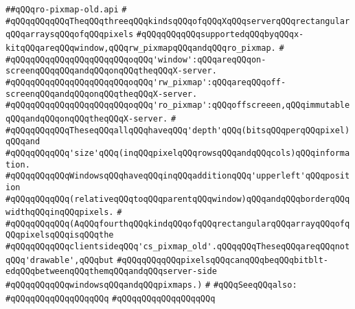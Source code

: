 \label{src/lib/x-kit/xclient/src/window/ro-pixmap-old.api}
\verb|##qQQqro-pixmap-old.api|\newline
\verb|#|\newline
\verb|#qQQqqQQqqQQqTheqQQqthreeqQQqkindsqQQqofqQQqXqQQqserverqQQqrectangularqQQqarraysqQQqofqQQqpixels|\newline
\verb|#qQQqqQQqqQQqsupportedqQQqbyqQQqx-kitqQQqareqQQqwindow,qQQqrw_pixmapqQQqandqQQqro_pixmap.|\newline
\verb|#|\newline
\verb|#qQQqqQQqqQQqqQQqqQQqqQQqoqQQq'window':qQQqareqQQqon-screenqQQqqQQqandqQQqonqQQqtheqQQqX-server.|\newline
\verb|#qQQqqQQqqQQqqQQqqQQqqQQqoqQQq'rw_pixmap':qQQqareqQQqoff-screenqQQqandqQQqonqQQqtheqQQqX-server.|\newline
\verb|#qQQqqQQqqQQqqQQqqQQqqQQqoqQQq'ro_pixmap':qQQqoffscreeen,qQQqimmutableqQQqandqQQqonqQQqtheqQQqX-server.|\newline
\verb|#|\newline
\verb|#qQQqqQQqqQQqTheseqQQqallqQQqhaveqQQq'depth'qQQq(bitsqQQqperqQQqpixel)qQQqand|\newline
\verb|#qQQqqQQqqQQq'size'qQQq(inqQQqpixelqQQqrowsqQQqandqQQqcols)qQQqinformation.|\newline
\verb|#qQQqqQQqqQQqWindowsqQQqhaveqQQqinqQQqadditionqQQq'upperleft'qQQqposition|\newline
\verb|#qQQqqQQqqQQq(relativeqQQqtoqQQqparentqQQqwindow)qQQqandqQQqborderqQQqwidthqQQqinqQQqpixels.|\newline
\verb|#|\newline
\verb|#qQQqqQQqqQQq(AqQQqfourthqQQqkindqQQqofqQQqrectangularqQQqarrayqQQqofqQQqpixelsqQQqisqQQqthe|\newline
\verb|#qQQqqQQqqQQqclientsideqQQq'cs_pixmap_old'.qQQqqQQqTheseqQQqareqQQqnotqQQq'drawable',qQQqbut|\newline
\verb|#qQQqqQQqqQQqpixelsqQQqcanqQQqbeqQQqbitblt-edqQQqbetweenqQQqthemqQQqandqQQqserver-side|\newline
\verb|#qQQqqQQqqQQqwindowsqQQqandqQQqpixmaps.)|\newline
\verb|#|\newline
\verb|#qQQqSeeqQQqalso:|\newline
\verb|#qQQqqQQqqQQqqQQqqQQq|\newline
\verb|#qQQqqQQqqQQqqQQqqQQq|\newline
